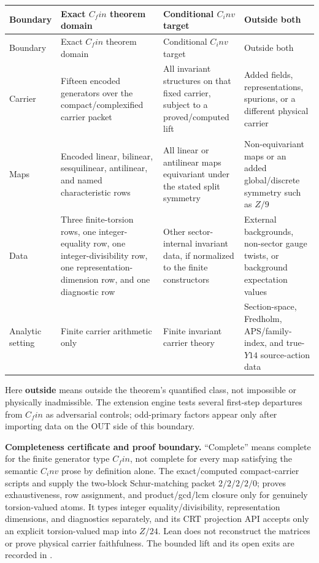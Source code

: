 \documentclass[11pt]{article}
\theoremstyle{remark}
\begin{document}
{\small
\begin{longtable}{P{0.14\textwidth}P{0.24\textwidth}P{0.24\textwidth}P{0.24\textwidth}}
\toprule
Boundary & Exact $C_fin$ theorem domain & Conditional $C_inv$ target & Outside both \\
\midrule
\endfirsthead
\toprule
Boundary & Exact $C_fin$ theorem domain & Conditional $C_inv$ target & Outside both \\
\midrule
\endhead
Carrier & Fifteen encoded generators over the compact/complexified carrier packet & All invariant structures on that fixed carrier, subject to a proved/computed lift & Added fields, representations, spurions, or a different physical carrier \\
Maps & Encoded linear, bilinear, sesquilinear, antilinear, and named characteristic rows & All linear or antilinear maps equivariant under the stated split symmetry & Non-equivariant maps or an added global/discrete symmetry such as $Z/9$ \\
Data & Three finite-torsion rows, one integer-equality row, one integer-divisibility row, one representation-dimension row, and one diagnostic row & Other sector-internal invariant data, if normalized to the finite constructors & External backgrounds, non-sector gauge twists, or background expectation values \\
Analytic setting & Finite carrier arithmetic only & Finite invariant carrier theory & Section-space, Fredholm, APS/family-index, and true-$Y14$ source-action data \\
\bottomrule
\end{longtable}
}
Here \textbf{outside} means outside the theorem's quantified class, not impossible or physically inadmissible. The extension engine tests several first-step departures from $C_fin$ as adversarial controls; odd-primary factors appear only after importing data on the OUT side of this boundary.

\textbf{Completeness certificate and proof boundary.} ``Complete'' means complete for the finite generator type $C_fin$, not complete for every map satisfying the semantic $C_inv$ prose by definition alone. The exact/computed compact-carrier scripts  and  supply the two-block Schur-matching packet $2/2/2/2/0$;  proves exhaustiveness, row assignment, and product/gcd/lcm closure only for genuinely torsion-valued atoms. It types integer equality/divisibility, representation dimensions, and diagnostics separately, and its CRT projection API accepts only an explicit torsion-valued map into $Z/24$. Lean does not reconstruct the matrices or prove physical carrier faithfulness. The bounded lift and its open exits are recorded in .
\end{document}
